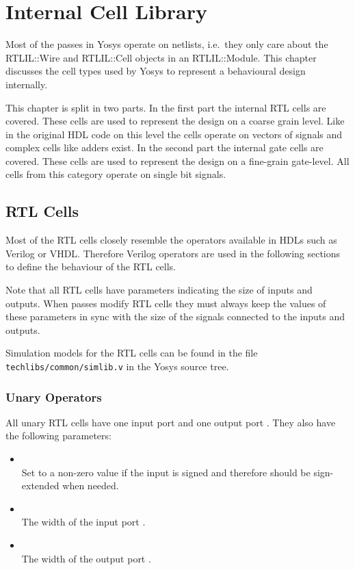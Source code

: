 
\chapter{Internal Cell Library}
\label{chapter:celllib}

Most of the passes in Yosys operate on netlists, i.e.~they only care about the RTLIL::Wire and RTLIL::Cell
objects in an RTLIL::Module. This chapter discusses the cell types used by Yosys to represent a behavioural
design internally.

This chapter is split in two parts. In the first part the internal RTL cells are covered. These cells
are used to represent the design on a coarse grain level. Like in the original HDL code on this level the
cells operate on vectors of signals and complex cells like adders exist. In the second part the internal
gate cells are covered. These cells are used to represent the design on a fine-grain gate-level. All cells
from this category operate on single bit signals.

\section{RTL Cells}

Most of the RTL cells closely resemble the operators available in HDLs such as
Verilog or VHDL. Therefore Verilog operators are used in the following sections
to define the behaviour of the RTL cells.

Note that all RTL cells have parameters indicating the size of inputs and outputs. When
passes modify RTL cells they must always keep the values of these parameters in sync with
the size of the signals connected to the inputs and outputs.

Simulation models for the RTL cells can be found in the file {\tt techlibs/common/simlib.v} in the Yosys
source tree.

\subsection{Unary Operators}

All unary RTL cells have one input port  and one output port . They also
have the following parameters:

\begin{itemize}
\item {} \\
Set to a non-zero value if the input  is signed and therefore should be sign-extended
when needed.

\item {} \\
The width of the input port .

\item {} \\
The width of the output port .
\end{itemize}

